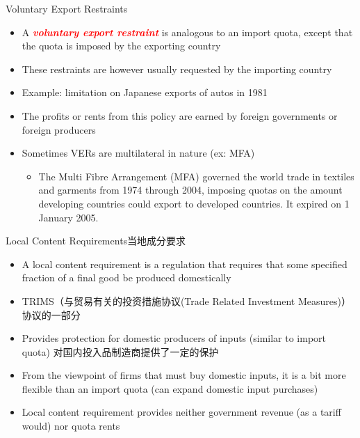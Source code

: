 \documentclass[10pt,hyperref={CJKbookmarks=true},xcolor=dvipsnames,aspectratio=169]{beamer}
\begin{document}
\begin{frame}{Voluntary Export Restraints}

\begin{itemize}
\item A \textbf{\textcolor{red}{\emph{voluntary export restraint}}} is analogous
to an import quota, except that the quota is imposed by the exporting
country 
\item These restraints are however usually requested by the importing country 
\item Example: limitation on Japanese exports of autos in 1981 
\item The profits or rents from this policy are earned by foreign governments
or foreign producers 
\item Sometimes VERs are multilateral in nature (ex: MFA)

\begin{itemize}
\item The Multi Fibre Arrangement (MFA) governed the world trade in textiles
and garments from 1974 through 2004, imposing quotas on the amount
developing countries could export to developed countries. It expired
on 1 January 2005.
\end{itemize}
\end{itemize}
\end{frame}

\begin{frame}{Local Content Requirements当地成分要求}

\begin{itemize}
\item A local content requirement is a regulation that requires that some
specified fraction of a final good be produced domestically \
\item TRIMS（与贸易有关的投资措施协议(Trade Related Investment Measures)） 协议的一部分
\item Provides protection for domestic producers of inputs (similar to import
quota) 对国内投入品制造商提供了一定的保护
\item From the viewpoint of firms that must buy domestic inputs, it is a
bit more flexible than an import quota (can expand domestic input
purchases) 
\item Local content requirement provides neither government revenue (as
a tariff would) nor quota rents
\end{itemize}
\end{frame}
\end{document}
